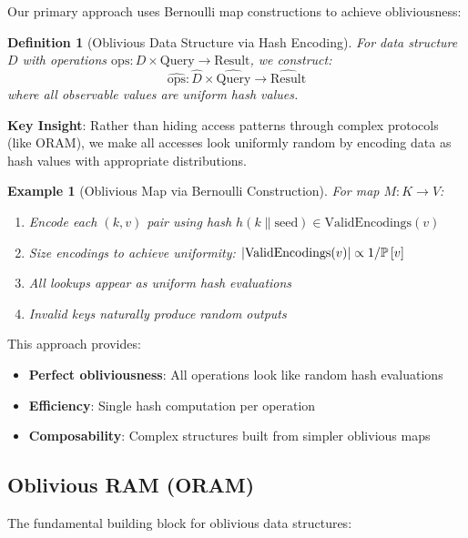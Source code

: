 \documentclass[11pt,final]{article}
\newtheorem{definition}[theorem]{Definition}
\newtheorem{example}[theorem]{Example}
\begin{document}
Our primary approach uses Bernoulli map constructions to achieve obliviousness:

\begin{definition}[Oblivious Data Structure via Hash Encoding]
For data structure $D$ with operations $\text{ops}: D \times \text{Query} \to \text{Result}$, we construct:
\begin{equation}
\widehat{\text{ops}}: \widehat{D} \times \widehat{\text{Query}} \to \widehat{\text{Result}}
\end{equation}
where all observable values are uniform hash values.
\end{definition}

\textbf{Key Insight}: Rather than hiding access patterns through complex protocols (like ORAM), we make all accesses look uniformly random by encoding data as hash values with appropriate distributions.

\begin{example}[Oblivious Map via Bernoulli Construction]
For map $M: K \to V$:
\begin{enumerate}
    \item Encode each $(k, v)$ pair using hash $h(k \| \text{seed}) \in \text{ValidEncodings}(v)$
    \item Size encodings to achieve uniformity: $|\text{ValidEncodings}(v)| \propto 1/\mathbb{P}\left[v\right]$
    \item All lookups appear as uniform hash evaluations
    \item Invalid keys naturally produce random outputs
\end{enumerate}
\end{example}

This approach provides:
\begin{itemize}
    \item \textbf{Perfect obliviousness}: All operations look like random hash evaluations
    \item \textbf{Efficiency}: Single hash computation per operation
    \item \textbf{Composability}: Complex structures built from simpler oblivious maps
\end{itemize}

\subsection{Oblivious RAM (ORAM)}

The fundamental building block for oblivious data structures:
\end{document}
